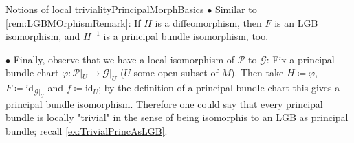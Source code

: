\documentclass[reqno,a4paper,oneside]{amsart}
\theoremstyle{plain}
\theoremstyle{remark}
\theoremstyle{definition}
\def\bas#1\eas{\begin{align*}#1\end{align*}}
\begin{document}
\begin{remarks}{Notions of local triviality}{PrincipalMorphBasics}
$\bullet$ Similar to \ref{rem:LGBMOrphismRemark}: If $H$ is a diffeomorphism, then $F$ is an LGB isomorphism, and $H^{-1}$ is a principal bundle isomorphism, too.
%
%

$\bullet$ Finally, observe that we have a local isomorphism of $\mathcal{P}$ to $\mathcal{G}$: Fix a principal bundle chart $\varphi: \mathcal{P}|_U \to \mathcal{G}|_U$ ($U$ some open subset of $M$). Then take $H \coloneqq \varphi$, $F \coloneqq \mathrm{id}_{\mathcal{G}|_U}$ and $f \coloneqq \mathrm{id}_U$; by the definition of a principal bundle chart this gives a principal bundle isomorphism. Therefore one could say that every principal bundle is locally "trivial" in the sense of being isomorphis to an LGB as principal bundle; recall \ref{ex:TrivialPrincAsLGB}. 


\end{remarks}
\end{document}
